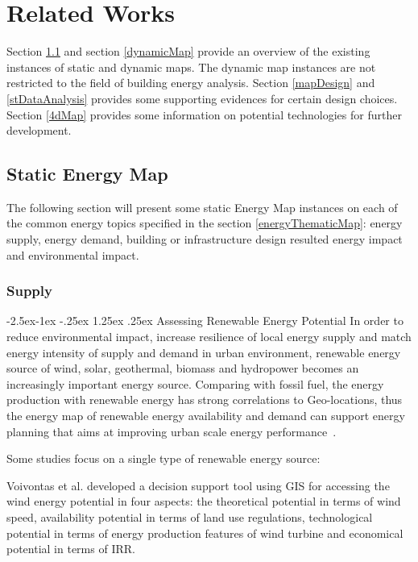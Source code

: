 \documentclass[hidelinks,12pt]{article}
\makeatletter
\renewcommand\paragraph{\@startsection{paragraph}{4}{\z@}%
            {-2.5ex\@plus -1ex \@minus -.25ex}%
            {1.25ex \@plus .25ex}%
            {\normalfont\normalsize\bfseries}}
\makeatother
\begin{document}
\newpage
\section{Related Works}
Section \ref{staticEnergyMap} and section \ref{dynamicMap} provide an
overview of the existing instances of static and dynamic maps. The
dynamic map instances are not restricted to the field of building
energy analysis. Section \ref{mapDesign} and \ref{stDataAnalysis}
provides some supporting evidences for certain design choices. Section
\ref{4dMap} provides some information on potential technologies for
further development.

\subsection{Static Energy Map}\label{staticEnergyMap}
The following section will present some static Energy Map instances on
each of the common energy topics specified in the section
\ref{energyThematicMap}: energy supply, energy demand, building or infrastructure design
resulted energy impact and environmental impact. 

\subsubsection{Supply}
\paragraph{Assessing Renewable Energy Potential}
In order to reduce environmental impact, increase resilience of local
energy supply and match energy intensity of supply and demand in urban
environment, renewable energy source of wind, solar, geothermal,
biomass and hydropower becomes an increasingly important energy
source. Comparing with fossil fuel, the energy production with
renewable energy has strong correlations to Geo-locations, thus the
energy map of renewable energy availability and demand can support
energy planning that aims at improving urban scale energy
performance~\cite{Ramachandra20071460}.

Some studies focus on a single type of renewable energy source:

Voivontas et al. developed a decision support tool using GIS for
accessing the wind energy potential in four aspects: the theoretical
potential in terms of wind speed, availability potential in terms of
land use regulations, technological potential in terms of energy
production features of wind turbine and economical potential in terms
of IRR. 
\end{document}
